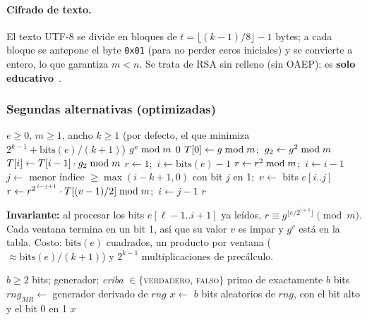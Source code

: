 \paragraph{Cifrado de texto.} El texto UTF-8 se divide en bloques de
$t = \lfloor (k-1)/8 \rfloor - 1$ bytes; a cada bloque se antepone el byte
\texttt{0x01} (para no perder ceros iniciales) y se convierte a entero, lo que
garantiza $m < n$. Se trata de RSA sin relleno (sin OAEP): es
\textbf{solo educativo}~\cite{rfc8017}.

\subsubsection{Segundas alternativas (optimizadas)}

\begin{algorithm}[H]
\caption{\textsc{ExpVentana}$(g, e, m, k)$ \hfill ventana deslizante}
\label{alg:ventana}
\begin{algorithmic}[1]
\Require $e \ge 0$, $m \ge 1$, ancho $k \ge 1$ (por defecto, el que minimiza $2^{k-1} + \mathrm{bits}(e)/(k+1)$)
\Ensure $g^e \bmod m$
 \Return $0$ \EndIf
\State $T[0] \gets g \bmod m$;\ $g_2 \gets g^2 \bmod m$
 \State $T[i] \gets T[i-1] \cdot g_2 \bmod m$  \EndFor
\State $r \gets 1$;\ $i \gets \mathrm{bits}(e) - 1$
   \State $r \gets r^2 \bmod m$;\ $i \gets i - 1$
  \Else
    \State $j \gets$ menor índice $\ge \max(i-k+1, 0)$ con bit $j$ en 1;\ $v \gets$ bits $e[i..j]$ 
    \State $r \gets r^{2^{\,i-j+1}} \cdot T[(v-1)/2] \bmod m$;\ $i \gets j - 1$
  \EndIf
\EndWhile
\State \Return $r$
\end{algorithmic}
\end{algorithm}

\noindent\textbf{Invariante:} al procesar los bits $e[\ell-1..i+1]$ ya leídos,
$r \equiv g^{\lfloor e / 2^{i+1} \rfloor} \pmod m$. Cada ventana termina en un
bit 1, así que su valor $v$ es impar y $g^v$ está en la tabla. Costo: $\mathrm{bits}(e)$
cuadrados, un producto por ventana ($\approx \mathrm{bits}(e)/(k+1)$) y $2^{k-1}$
multiplicaciones de precálculo.

\begin{algorithm}[H]
\caption{\textsc{GenerarPrimoConCriba}$(b, \mathit{rng}, \mathit{criba})$}
\label{alg:criba}
\begin{algorithmic}[1]
\Require $b \ge 2$ bits; generador; \textit{criba} $\in \{$\textsc{verdadero}, \textsc{falso}$\}$
\Ensure primo de exactamente $b$ bits
\State $\mathit{rng}_{MR} \gets$ generador derivado de $\mathit{rng}$ 
\Repeat
  \State $x \gets$ $b$ bits aleatorios de $\mathit{rng}$, con el bit alto y el bit 0 en 1
   \Continue \EndIf
{} 
\State \Return $x$
\end{algorithmic}
\end{algorithm}

